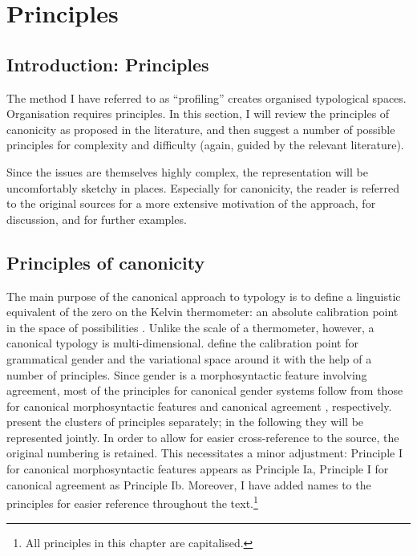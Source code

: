 \documentclass[output=collectionpaper]{langsci/langscibook}
\begin{document}
\section{Principles}
\label{sec:Audr:2}

\subsection{Introduction: Principles}

The method I have referred to as ``profiling'' creates organised typological spaces. Organisation requires principles. In this section, I will review the principles of canonicity as proposed in the literature, and then suggest a number of possible principles for complexity and difficulty (again, guided by the relevant literature).

Since the issues are themselves highly complex, the representation will be uncomfortably sketchy in places. Especially for canonicity, the reader is referred to the original sources for a more extensive motivation of the approach, for discussion, and for further examples.

\largerpage[-1]
\subsection{Principles of canonicity}
\label{sec:Audr:2.2}

The main purpose of the canonical approach to typology is to define a linguistic equivalent of the zero on the Kelvin thermometer: an absolute calibration point in the space of possibilities \citep{Fedden2015}. Unlike the scale of a thermometer, however, a canonical typology is multi-dimensional. \citet{Corbett2016} define the calibration point for grammatical gender and the variational space around it with the help of a number of principles. Since gender is a morphosyntactic feature involving agreement, most of the principles for canonical gender systems follow from those for canonical morphosyntactic features \citep{Corbett2012} and canonical agreement \citep{Corbett2006}, respectively. \citet{Corbett2016} present the clusters of principles separately; in the following they will be represented jointly. In order to allow for easier cross-reference to the source, the original numbering is retained. This necessitates a minor adjustment: Principle I for canonical morphosyntactic features appears as Principle Ia, Principle I for canonical agreement as Principle Ib. Moreover, I have added names to the principles for easier reference throughout the text.\footnote{All principles in this chapter are capitalised.}
\end{document}
